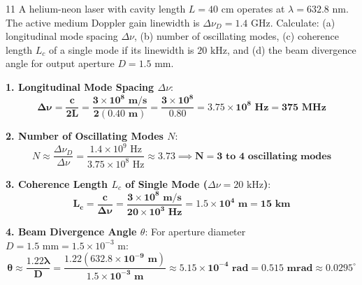 \begin{theoryq}{11}
A helium-neon laser with cavity length $L = 40\text{ cm}$ operates at $\lambda = 632.8\text{ nm}$. The active medium Doppler gain linewidth is $\Delta \nu_D = 1.4\text{ GHz}$. Calculate: (a) longitudinal mode spacing $\Delta \nu$, (b) number of oscillating modes, (c) coherence length $L_c$ of a single mode if its linewidth is $20\text{ kHz}$, and (d) the beam divergence angle for output aperture $D = 1.5\text{ mm}$.
\end{theoryq}
\begin{theorysol}
\textbf{1. Longitudinal Mode Spacing $\Delta \nu$}:
\begin{equation}
\mathbf{\Delta \nu = \frac{c}{2L} = \frac{3 \times 10^8\text{ m/s}}{2(0.40\text{ m})} = \frac{3 \times 10^8}{0.80} = 3.75 \times 10^8\text{ Hz} = 375\text{ MHz}}
\end{equation}

\textbf{2. Number of Oscillating Modes $N$}:
\begin{equation}
N \approx \frac{\Delta \nu_D}{\Delta \nu} = \frac{1.4 \times 10^9\text{ Hz}}{3.75 \times 10^8\text{ Hz}} \approx 3.73 \implies \mathbf{N = 3 \text{ to } 4\text{ oscillating modes}}
\end{equation}

\textbf{3. Coherence Length $L_c$ of Single Mode ($\Delta\nu = 20\text{ kHz}$)}:
\begin{equation}
\mathbf{L_c = \frac{c}{\Delta\nu} = \frac{3 \times 10^8\text{ m/s}}{20 \times 10^3\text{ Hz}} = 1.5 \times 10^4\text{ m} = 15\text{ km}}
\end{equation}

\textbf{4. Beam Divergence Angle $\theta$}:
For aperture diameter $D = 1.5\text{ mm} = 1.5 \times 10^{-3}\text{ m}$:
\begin{equation}
\mathbf{\theta \approx \frac{1.22 \lambda}{D} = \frac{1.22(632.8 \times 10^{-9}\text{ m})}{1.5 \times 10^{-3}\text{ m}} \approx 5.15 \times 10^{-4}\text{ rad} = 0.515\text{ mrad} \approx 0.0295^\circ}
\end{equation}
\end{theorysol}
\vspace{4mm}


